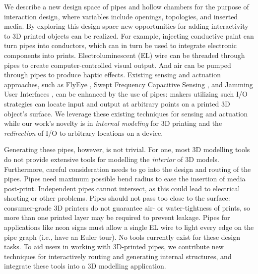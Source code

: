 We describe a new design space of pipes and hollow chambers for the purpose of interaction design, where variables include openings, topologies, and inserted media. By exploring this design space new opportunities for adding interactivity to 3D printed objects can be realized. For example, injecting conductive paint can turn pipes into conductors, which can in turn be used to integrate electronic components into prints. Electroluminescent (EL) wire can be threaded through pipes to create computer-controlled visual output. And air can be pumped through pipes to produce haptic effects.  Existing sensing and actuation approaches, such as FlyEye \cite{Wimmer-flyeye}, Swept Frequency Capacitive Sensing \cite{Sato-touche}, and Jamming User Interfaces \cite{Follmer-jamming}, can be enhanced by the use of pipes: makers utilizing such I/O strategies can locate input and output at arbitrary points on a printed 3D object's surface.  We leverage these existing techniques for sensing and actuation while our work's novelty is in \emph{internal modeling} for 3D printing and the \emph{redirection} of I/O to arbitrary locations on a device.


Generating these pipes, however, is not trivial.  For one, most 3D modelling tools do not provide extensive tools for modelling the  {\em interior} of 3D models. Furthermore, careful consideration needs to go into the design and routing of the pipes. Pipes need maximum possible bend radius to ease the insertion of media post-print.  Independent pipes cannot intersect, as this could lead to electrical shorting or other problems.  Pipes should not pass too close to the surface: consumer-grade 3D printers do not guarantee air- or water-tightness of prints, so more than one printed layer may be required to prevent leakage.  Pipes for applications like neon signs must allow a single EL wire to light every edge on the pipe graph (i.e., have an Euler tour).  No tools currently exist for these design tasks. To aid users in working with 3D-printed pipes, we contribute new techniques for interactively routing and generating internal structures, and integrate these tools into a 3D modelling application. 

